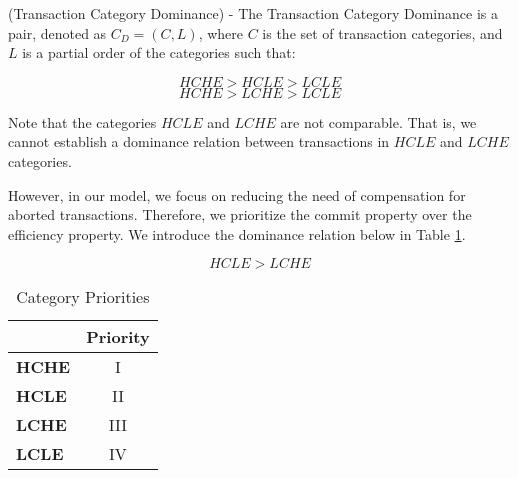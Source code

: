 \begin{definition}
\label{cat_dominance}
(Transaction Category Dominance) - The Transaction Category Dominance is a pair, denoted as $C_{D} = (C,L)$, where $C$ is the set of transaction categories, and $L$ is a partial order of the categories such that:
 
\[\textrm{$HCHE > HCLE > LCLE$}\]
\[\textrm{$HCHE > LCHE > LCLE$} \]

\begin{figure}[h]
\captionsetup{justification=centering}
\centering %


\label{fig:category_lattice} %

\end{figure}

{\normalfont Note that the categories $HCLE$ and $LCHE$ are not comparable. That is, we cannot establish a dominance relation between transactions in $HCLE$ and $LCHE$ categories.

However, in our model, we focus on reducing the need of compensation for aborted transactions. Therefore, we prioritize the commit property over the efficiency property. We introduce the dominance relation below in Table \ref{tbl:priority}.}

\[\textrm{$HCLE > LCHE$} \]
 
\begin{table}[h]
\captionsetup{justification=centering}
\centering
\begin{tabular}{l|c|}
\cline{2-2}
                                          & \multicolumn{1}{l|}{\textbf{Priority}} \\ \hline
\multicolumn{1}{|l|}{\textbf{HCHE}}  & I                                      \\ \hline
\multicolumn{1}{|l|}{\textbf{HCLE}}  & II                                     \\ \hline
\multicolumn{1}{|l|}{\textbf{LCHE}} & III                                     \\ \hline
\multicolumn{1}{|l|}{\textbf{LCLE}} & IV                                      \\ \hline
\end{tabular}

\caption{Category Priorities} %
\label{tbl:priority} %

\end{table} 

\end{definition}


